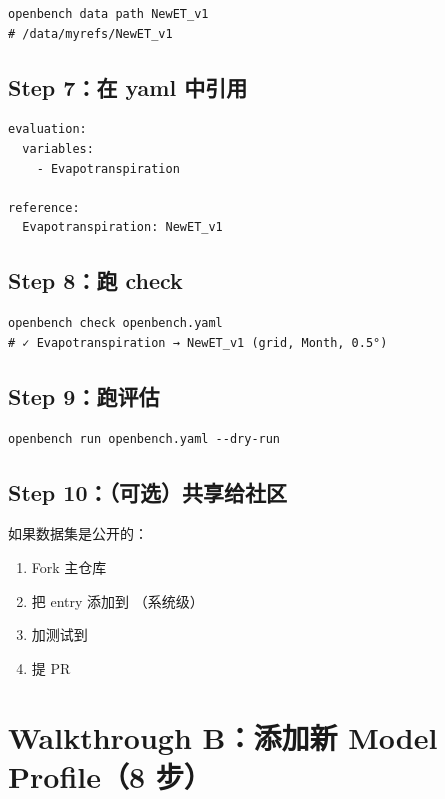 \begin{verbatim}
openbench data path NewET_v1
# /data/myrefs/NewET_v1
\end{verbatim}

\subsection{Step 7：在 yaml 中引用}

\begin{verbatim}
evaluation:
  variables:
    - Evapotranspiration

reference:
  Evapotranspiration: NewET_v1
\end{verbatim}

\subsection{Step 8：跑 check}

\begin{verbatim}
openbench check openbench.yaml
# ✓ Evapotranspiration → NewET_v1 (grid, Month, 0.5°)
\end{verbatim}

\subsection{Step 9：跑评估}

\begin{verbatim}
openbench run openbench.yaml --dry-run
\end{verbatim}

\subsection{Step 10：（可选）共享给社区}

如果数据集是公开的：

\begin{enumerate}
  \item Fork 主仓库
  \item 把 entry 添加到 （系统级）
  \item 加测试到 
  \item 提 PR
\end{enumerate}

\section{Walkthrough B：添加新 Model Profile（8 步）}

